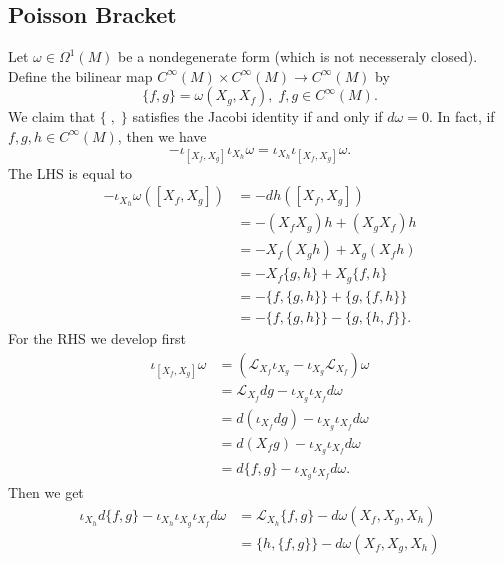 \subsection{Poisson Bracket}
Let $\omega\in\Omega^1(M)$ be a nondegenerate form (which is not necesseraly closed). Define the 
bilinear map $C^\infty(M)\times C^\infty(M)\to C^\infty(M)$ by 
\begin{equation}
    \{f,g\}=\omega(X_g,X_f),\; f,g\in C^\infty(M).
\end{equation}
We claim that $\{\;,\;\}$ satisfies the Jacobi identity if and only if $d\omega=0$. In fact, if $f,g,h\in C^\infty(M)$, then 
we have 
\begin{equation}
 -\iota_{[X_f,X_g]}\iota_{X_h}\omega = \iota_{X_h}\iota_{[X_f,X_g]}\omega.
\end{equation}
The LHS is equal to 
\begin{equation}
    \begin{split}
       -\iota_{X_h}\omega([X_f,X_g])&=-dh([X_f,X_g])\\
        &=-(X_fX_g)h+(X_gX_f)h\\
        &=-X_f(X_gh)+X_g(X_fh)\\
        &=-X_f\{g,h\}+X_g\{f,h\}\\
        &=-\{f,\{g,h\}\}+\{g,\{f,h\}\}\\
        &=-\{f,\{g,h\}\}-\{g,\{h,f\}\}.
    \end{split}
\end{equation}
For the RHS we develop first 
\begin{equation}
    \begin{split}
        \iota_{[X_f,X_g]}\omega&=(\mathcal{L}_{X_f}\iota_{X_g}-\iota_{X_g}\mathcal{L}_{X_f})\omega\\
        &=\mathcal{L}_{X_f}dg -\iota_{X_g}\iota_{X_f}d\omega \\
        &=d(\iota_{X_f}dg)-\iota_{X_g}\iota_{X_f}d\omega\\
        &=d(X_fg)-\iota_{X_g}\iota_{X_f}d\omega\\
        &=d\{f,g\}-\iota_{X_g}\iota_{X_f}d\omega.
    \end{split}
\end{equation}
Then we get 
\begin{equation}
    \begin{split}
       \iota_{X_h}d\{f,g\}-\iota_{X_h}\iota_{X_g}\iota_{X_f}d\omega&=\mathcal{L}_{X_h}\{f,g\}-d\omega(X_f,X_g,X_h)\\
       &=\{h,\{f,g\}\}-d\omega(X_f,X_g,X_h)
    \end{split}
\end{equation}
